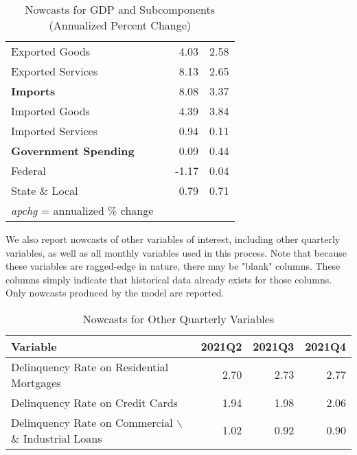 \documentclass[11pt, letterpaper]{article}\usepackage[]{graphicx}\usepackage[]{color}
\begin{document}
\begin{table}[H]
\begin{tabular}{lrrr}
  \hspace{8mm}  Exported Goods &  & 4.03 & 2.58 \\ 
  \hspace{8mm}  Exported Services &  & 8.13 & 2.65 \\ 
  \hspace{0mm} \textbf{Imports} &  & 8.08 & 3.37 \\ 
  \hspace{8mm}  Imported Goods &  & 4.39 & 3.84 \\ 
  \hspace{8mm}  Imported Services &  & 0.94 & 0.11 \\ 
  \hspace{0mm} \textbf{Government Spending} &  & 0.09 & 0.44 \\ 
  \hspace{8mm}  Federal &  & -1.17 & 0.04 \\ 
  \hspace{8mm}  State \& Local &  & 0.79 & 0.71 \\ 
   \hline 
 \textit{apchg} = annualized \% change 
\end{tabular}
\endgroup
\caption{Nowcasts for GDP and Subcomponents (Annualized Percent Change)} 
\end{table}


We also report nowcasts of other variables of interest, including other quarterly variables, as well as all monthly variables used in this process. Note that because these variables are ragged-edge in nature, there may be "blank" columns. These columns simply indicate that historical data already exists for those columns. Only nowcasts produced by the model are reported.
\begin{table}[H]
\centering
\begingroup\fontsize{11pt}{13pt}\selectfont
\begin{tabular}{lrrr}
  \hline
Variable & 2021Q2 & 2021Q3 & 2021Q4 \\ 
  \hline
Delinquency Rate on Residential Mortgages & 2.70 & 2.73 & 2.77 \\ 
  Delinquency Rate on Credit Cards & 1.94 & 1.98 & 2.06 \\ 
  Delinquency Rate on Commercial $\backslash$\& Industrial Loans & 1.02 & 0.92 & 0.90 \\ 
   \hline
\end{tabular}
\endgroup
\caption{Nowcasts for Other Quarterly Variables} 
\end{table}
\end{document}
